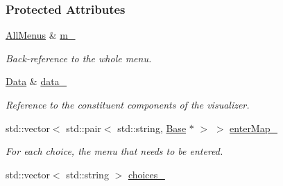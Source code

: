 \subsubsection*{Protected Attributes}
\begin{DoxyCompactItemize}
\item 
\hyperlink{structslb_1_1core_1_1ui_1_1AllMenus}{All\+Menus} \& \hyperlink{structslb_1_1core_1_1ui_1_1MenuBase_a5b2b8876459e3a82c2736bd2637181ab}{m\+\_\+}\hypertarget{structslb_1_1core_1_1ui_1_1MenuBase_a5b2b8876459e3a82c2736bd2637181ab}{}\label{structslb_1_1core_1_1ui_1_1MenuBase_a5b2b8876459e3a82c2736bd2637181ab}

\begin{DoxyCompactList}\small\item\em Back-\/reference to the whole menu. \end{DoxyCompactList}\item 
\hyperlink{structslb_1_1core_1_1ui_1_1MenuBase_a1803444111552d2e5b87671292dd74cb}{Data} \& \hyperlink{structslb_1_1core_1_1ui_1_1MenuBase_a95cb3b6b89fe2185631417d0dc7d769f}{data\+\_\+}\hypertarget{structslb_1_1core_1_1ui_1_1MenuBase_a95cb3b6b89fe2185631417d0dc7d769f}{}\label{structslb_1_1core_1_1ui_1_1MenuBase_a95cb3b6b89fe2185631417d0dc7d769f}

\begin{DoxyCompactList}\small\item\em Reference to the constituent components of the visualizer. \end{DoxyCompactList}\item 
std\+::vector$<$ std\+::pair$<$ std\+::string, \hyperlink{structslb_1_1core_1_1ui_1_1MenuBase_a766bcf66d6b83992085bad43a4455585}{Base} $\ast$ $>$ $>$ \hyperlink{structslb_1_1core_1_1ui_1_1MenuBase_a1d0c310785fbde8da82aa0e218094050}{enter\+Map\+\_\+}\hypertarget{structslb_1_1core_1_1ui_1_1MenuBase_a1d0c310785fbde8da82aa0e218094050}{}\label{structslb_1_1core_1_1ui_1_1MenuBase_a1d0c310785fbde8da82aa0e218094050}

\begin{DoxyCompactList}\small\item\em For each choice, the menu that needs to be entered. \end{DoxyCompactList}\item 
std\+::vector$<$ std\+::string $>$ \hyperlink{structslb_1_1core_1_1ui_1_1MenuBase_a5ada6ccb413d170b2899125ebce9f9b0}{choices\+\_\+}\hypertarget{structslb_1_1core_1_1ui_1_1MenuBase_a5ada6ccb413d170b2899125ebce9f9b0}{}\label{structslb_1_1core_1_1ui_1_1MenuBase_a5ada6ccb413d170b2899125ebce9f9b0}


\end{DoxyCompactItemize}
